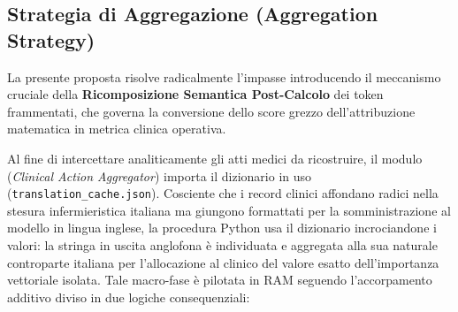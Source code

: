 \subsection{Strategia di Aggregazione (Aggregation Strategy)}
La presente proposta risolve radicalmente l'impasse introducendo il meccanismo cruciale della \textbf{Ricomposizione Semantica Post-Calcolo} dei token frammentati, che governa la conversione dello score grezzo dell'attribuzione matematica in metrica clinica operativa.

Al fine di intercettare analiticamente gli atti medici da ricostruire, il modulo (\textit{Clinical Action Aggregator}) importa il dizionario in uso (\texttt{translation\_cache.json}). Cosciente che i record clinici affondano radici nella stesura infermieristica italiana ma giungono formattati per la somministrazione al modello in lingua inglese, la procedura Python usa il dizionario incrociandone i valori: la stringa in uscita anglofona è individuata e aggregata alla sua naturale controparte italiana per l'allocazione al clinico del valore esatto dell'importanza vettoriale isolata. Tale macro-fase è pilotata in RAM seguendo l'accorpamento additivo diviso in due logiche consequenziali:
